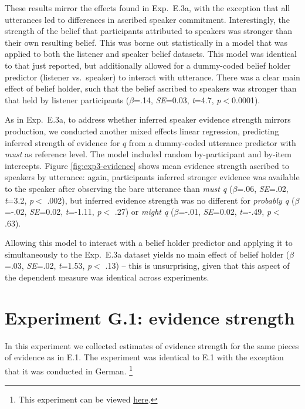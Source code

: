 \documentclass[11pt]{article}
\newcommand{\figref}[1]{Figure \ref{#1}}
\begin{document}
These results mirror the effects found in Exp.~E.3a, with the exception that all utterances led to differences in ascribed speaker commitment. Interestingly, the strength of the belief that participants attributed to speakers was stronger than their own resulting belief. This was borne out statistically in a model that was applied to both the listener and speaker belief datasets. This model was identical to that just reported, but additionally allowed for a dummy-coded belief holder predictor (listener vs.~speaker)  to interact with utterance. There was a clear main effect of belief holder, such that the belief ascribed to speakers was stronger than that held by listener participants ($\beta$=.14, \emph{SE}=0.03, \emph{t}=4.7, \emph{p}$<$0.0001). 

As in Exp.~E.3a, to address whether inferred speaker evidence strength mirrors production, we conducted another mixed effects linear regression, predicting inferred strength of evidence for $q$ from a dummy-coded utterance predictor with \emph{must} as reference level. The model included random by-participant and by-item intercepts.  \figref{fig:exp3-evidence} shows mean evidence strength ascribed to speakers by utterance:  again, participants inferred stronger evidence was available to the speaker after observing the bare utterance than \emph{must q} ($\beta$=.06, \emph{SE}=.02, \emph{t}=3.2, \emph{p}$<$ .002), but inferred evidence strength was no different for \emph{probably q} ($\beta$=-.02, \emph{SE}=0.02, \emph{t}=-1.11, \emph{p}$<$ .27) or \emph{might q} ($\beta$=-.01, \emph{SE}=0.02, \emph{t}=-.49, \emph{p}$<$ .63).

Allowing this model to interact with a belief holder predictor and applying it to simultaneously to the Exp.~E.3a dataset yields no main effect of belief holder ($\beta$=.03, \emph{SE}=.02, \emph{t}=1.53, \emph{p}$<$ .13) -- this is unsurprising, given that this aspect of the dependent measure was identical across experiments.

\section{Experiment G.1: evidence strength}

In this experiment we collected estimates of evidence strength for the same pieces of evidence as in E.1. The experiment was identical to E.1 with the exception that it was conducted in German. \footnote{This experiment can be viewed \href{http://web.stanford.edu/~jdegen/cgi-bin/4_dp_priors_evidencestrength/evidence.html}{here}.} 
\end{document}
